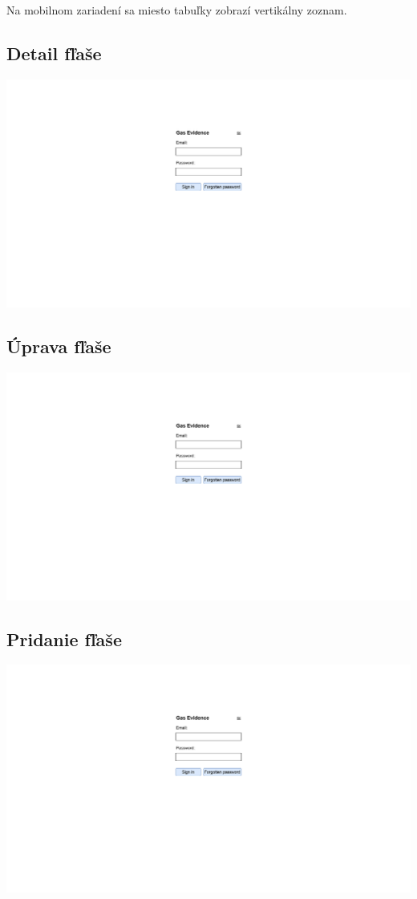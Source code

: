 \documentclass{zah}
\begin{document}
Na mobilnom zariadení sa miesto tabuľky zobrazí vertikálny zoznam.

\subsection{Detail fľaše}
\begin{center}
\includegraphics[width=.7\textwidth,page=4]{navrh-assets/ui}
\end{center}

\subsection{Úprava fľaše}
\begin{center}
\includegraphics[width=.7\textwidth,page=5]{navrh-assets/ui}
\end{center}

\subsection{Pridanie fľaše}
\begin{center}
\includegraphics[width=.7\textwidth,page=6]{navrh-assets/ui}
\end{center}
\end{document}

